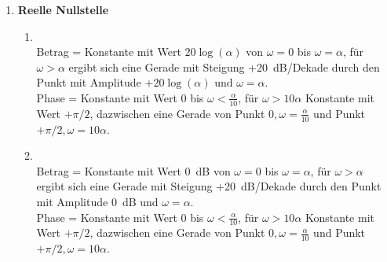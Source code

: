 {\begin{enumerate}
\begin{enumerate}
        Betrag = Konstante mit Wert -$20\log(\alpha)$ von $\omega=0$ bis $\omega=\alpha$, f\"ur $\omega>\alpha$ ergibt sich eine Gerade mit Steigung  -20~dB/Dekade durch den Punkt mit Amplitude -$20\log(\alpha)$ und  $\omega=\alpha$.\\
        Phase = Konstante mit Wert 0 bis $\omega<\frac{\alpha}{10}$,
        f\"ur $\omega>10\alpha$ Konstante mit Wert -$\pi/2$,
        dazwischen eine Gerade von Punkt $0,\omega=\frac{\alpha}{10}$
        und Punkt -$\pi/2,\omega=10\alpha$.
        \item{} \\
        Betrag = Konstante mit Wert 0~dB von $\omega=0$ bis $\omega=\alpha$, f\"ur $\omega>\alpha$ ergibt sich eine Gerade mit Steigung  -20~dB/Dekade durch den Punkt mit Amplitude 0~dB und  $\omega=\alpha$.\\
        Phase = Konstante mit Wert 0 bis $\omega<\frac{\alpha}{10}$,
        f\"ur $\omega>10\alpha$ Konstante mit Wert -$\pi/2$,
        dazwischen eine Gerade von Punkt $0,\omega=\frac{\alpha}{10}$
        und Punkt -$\pi/2,\omega=10\alpha$.
        \end{enumerate}
\item{} {\bf Reelle Nullstelle} 
 \begin{enumerate}\item{} \\ 
        Betrag = Konstante mit Wert $20\log(\alpha)$ von $\omega=0$ bis $\omega=\alpha$, f\"ur $\omega>\alpha$ ergibt sich eine Gerade mit Steigung  +20~dB/Dekade durch den Punkt mit Amplitude $+20\log(\alpha)$ und  $\omega=\alpha$.\\
        Phase = Konstante mit Wert 0 bis $\omega<\frac{\alpha}{10}$, f\"ur $\omega>10\alpha$ Konstante mit Wert $+\pi/2$, dazwischen eine Gerade von Punkt $0,\omega=\frac{\alpha}{10}$ und Punkt $+\pi/2,\omega=10\alpha$.
\item{} \\ 
        Betrag = Konstante mit Wert 0~dB von $\omega=0$ bis $\omega=\alpha$, f\"ur $\omega>\alpha$ ergibt sich eine Gerade mit Steigung  +20~dB/Dekade durch den Punkt mit Amplitude 0~dB und  $\omega=\alpha$.\\
        Phase = Konstante mit Wert 0 bis $\omega<\frac{\alpha}{10}$, f\"ur $\omega>10\alpha$ Konstante mit Wert $+\pi/2$, dazwischen eine Gerade von Punkt $0,\omega=\frac{\alpha}{10}$ und Punkt $+\pi/2,\omega=10\alpha$.
        \end{enumerate}

\end{enumerate}}
